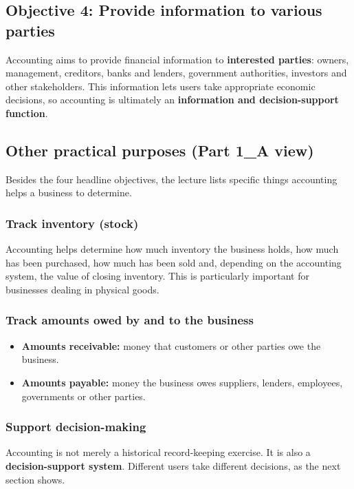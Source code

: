 \documentclass[11pt,a4paper]{article}
\begin{document}
\subsection{Objective 4: Provide information to various parties}

Accounting aims to provide financial information to \textbf{interested parties}: owners,
management, creditors, banks and lenders, government authorities, investors and other
stakeholders. This information lets users take appropriate economic decisions, so accounting
is ultimately an \textbf{information and decision-support function}.

\subsection{Other practical purposes (Part 1\_A view)}

Besides the four headline objectives, the lecture lists specific things accounting helps a
business to determine.

\subsubsection{Track inventory (stock)}
Accounting helps determine how much inventory the business holds, how much has been
purchased, how much has been sold and, depending on the accounting system, the value of
closing inventory. This is particularly important for businesses dealing in physical goods.

\subsubsection{Track amounts owed by and to the business}
\begin{itemize}
  \item \textbf{Amounts receivable:} money that customers or other parties owe the business.
  \item \textbf{Amounts payable:} money the business owes suppliers, lenders, employees,
        governments or other parties.
\end{itemize}

\subsubsection{Support decision-making}
Accounting is not merely a historical record-keeping exercise. It is also a
\textbf{decision-support system}. Different users take different decisions, as the next
section shows.
\end{document}
